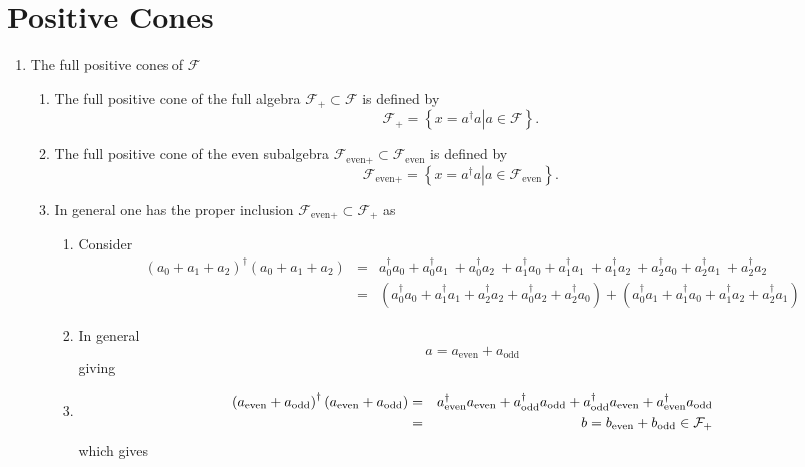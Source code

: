 \documentclass[aps,preprint]{revtex4}
\begin{document}
\section{Positive Cones}

\begin{enumerate}
\item The full positive cones$\mathcal{\ }$of $\mathcal{F}$

\begin{enumerate}
\item The full positive cone of the full algebra $\mathcal{F}_{+}\subset 
\mathcal{F}$ is defined by 
\begin{equation}
\mathcal{F}_{+}=\left\{ \left. x=a^{\dagger }a\right\vert a\in \mathcal{F}%
\right\} .
\end{equation}

\item The full positive cone of the even subalgebra $\mathcal{F}_{\text{even}%
+}\subset \mathcal{F}_{\text{even}}$ is defined by 
\begin{equation}
\mathcal{F}_{\text{even}+}=\left\{ \left. x=a^{\dagger }a\right\vert a\in 
\mathcal{F}_{\text{even}}\right\} .
\end{equation}

\item In general one has the proper inclusion $\mathcal{F}_{\text{even}%
+}\subset \mathcal{F}_{+}$ as

\begin{enumerate}
\item Consider 
\begin{eqnarray}
\left( a_{0}+a_{1}+a_{2}\right) ^{\dagger }\left( a_{0}+a_{1}+a_{2}\right)
&=&a_{0}^{\dagger }a_{0}+a_{0}^{\dagger }a_{1}\ +a_{0}^{\dagger }a_{2}\
+a_{1}^{\dagger }a_{0}+a_{1}^{\dagger }a_{1}\ +a_{1}^{\dagger }a_{2}\
+a_{2}^{\dagger }a_{0}+a_{2}^{\dagger }a_{1}\ +a_{2}^{\dagger }a_{2}\  \\
&=&\left( a_{0}^{\dagger }a_{0}+a_{1}^{\dagger }a_{1}+a_{2}^{\dagger
}a_{2}+a_{0}^{\dagger }a_{2}+a_{2}^{\dagger }a_{0}\right) +\left(
a_{0}^{\dagger }a_{1}+a_{1}^{\dagger }a_{0}+a_{1}^{\dagger
}a_{2}+a_{2}^{\dagger }a_{1}\right)
\end{eqnarray}

\item In general 
\begin{equation}
a=a_{\text{even}}+a_{\text{odd}}
\end{equation}%
giving

\item 
\begin{eqnarray}
\left( a_{\text{even}}+a_{\text{odd}}\right) ^{\dagger }\left( a_{\text{even}%
}+a_{\text{odd}}\right) &=&a_{\text{even}}^{\dagger }a_{\text{even}}+a_{%
\text{odd}}^{\dagger }a_{\text{odd}}+a_{\text{odd}}^{\dagger }a_{\text{even}%
}+a_{\text{even}}^{\dagger }a_{\text{odd}} \\
&=&b=b_{\text{even}}+b_{\text{odd}}\in \mathcal{F}_{+}
\end{eqnarray}%
which gives


\end{enumerate}
\end{enumerate}
\end{enumerate}
\end{document}
